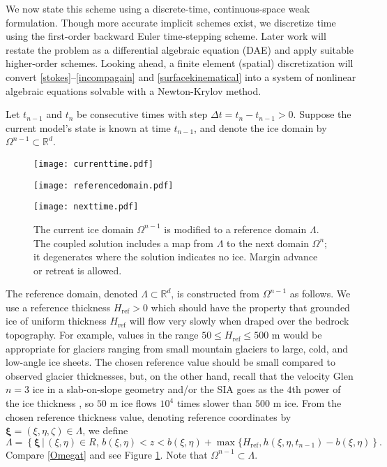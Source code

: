 \documentclass[letterpaper,final,12pt,reqno]{amsart}
\newcommand{\RR}{\mathbb{R}}
\newcommand{\bxi}{\bm{\xi}}
\newcommand{\Href}{H_{\text{ref}}}
\begin{document}
We now state this scheme using a discrete-time, continuous-space weak formulation.  Though more accurate implicit schemes exist, we discretize time using the first-order backward Euler time-stepping scheme.  Later work will restate the problem as a differential algebraic equation (DAE) and apply suitable higher-order schemes.  Looking ahead, a finite element (spatial) discretization will convert \eqref{stokes}--\eqref{incompagain} and \eqref{surfacekinematical} into a system of nonlinear algebraic equations solvable with a Newton-Krylov method.


Let $t_{n-1}$ and $t_n$ be consecutive times with step $\Delta t = t_n - t_{n-1} > 0$.  Suppose the current model's state is known at time $t_{n-1}$, and denote the ice domain by $\Omega^{n-1} \subset \RR^d$.

\begin{figure}[ht]
\begin{center}
\texttt{[image: currenttime.pdf]}
\vspace{-3mm}

\texttt{[image: referencedomain.pdf]}

\texttt{[image: nexttime.pdf]}
\end{center}
\caption{The current ice domain $\Omega^{n-1}$ is modified to a reference domain $\Lambda$.  The coupled solution includes a map from $\Lambda$ to the next domain $\Omega^n$; it degenerates where the solution indicates no ice.  Margin advance or retreat is allowed.}
\label{fig:domainupdate}
\end{figure}

The reference domain, denoted $\Lambda \subset \RR^d$, is constructed from $\Omega^{n-1}$ as follows.  We use a reference thickness $\Href>0$ which should have the property that grounded ice of uniform thickness $\Href$ will flow very slowly when draped over the bedrock topography.  For example, values in the range $50 \le \Href \le 500$ m would be appropriate for glaciers ranging from small mountain glaciers to large, cold, and low-angle ice sheets.  The chosen reference value should be small compared to observed glacier thicknesses, but, on the other hand, recall that the velocity Glen $n=3$ ice in a slab-on-slope geometry and/or the SIA goes as the $4$th power of the ice thickness \cite{GreveBlatter2009}, so $50$ m ice flows $10^4$ times slower than $500$ m ice.  From the chosen reference thickness value, denoting reference coordinates by $\bxi=(\xi,\eta,\zeta) \in \Lambda$, we define
\begin{equation}
\Lambda = \left\{\bxi\,\big|\,(\xi,\eta)\in R, \, b(\xi,\eta) < z < b(\xi,\eta) + \max\{\Href,h(\xi,\eta,t_{n-1})-b(\xi,\eta)\right\}.  \label{Lambda}
\end{equation}
Compare \eqref{Omegat} and see Figure \ref{fig:domainupdate}.  Note that $\Omega^{n-1} \subset \Lambda$.
\end{document}
